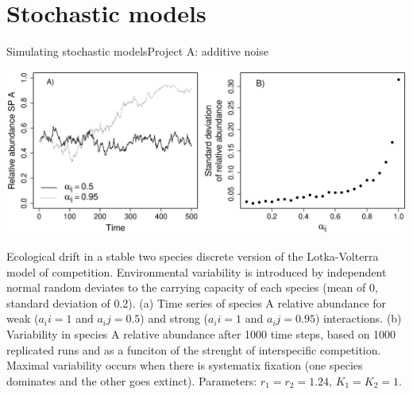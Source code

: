 \documentclass{eecslides}
\begin{document}

	\section{Stochastic models}

	\begin{frame}{Simulating stochastic models}{Project A: additive noise}

		\begin{center}
			\includegraphics[height=0.4\textheight]{drift_stab.eps}
		\end{center}

\tiny{Ecological drift in a stable two species discrete version of the Lotka-Volterra model of competition. Environmental variability is introduced by independent normal random deviates to the carrying capacity of each species (mean of 0, standard deviation of 0.2). (a) Time series of species A relative abundance for weak ($a_ii = 1$ and $a_ij = 0.5$) and strong ($a_ii = 1$ and $a_ij = 0.95$) interactions. (b) Variability in species A relative abundance after 1000 time steps, based on 1000 replicated runs and as a funciton of the strenght of interspecific competition. Maximal variability occurs when there is systematix fixation (one species dominates and the other goes extinct). Parameters: $r_1 = r_2 = 1.24$, $K_1 = K_2 = 1$.}

	\end{frame}

\end{document}
